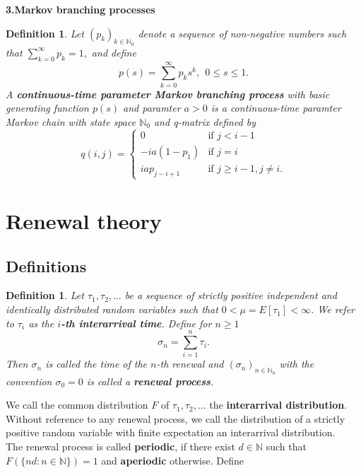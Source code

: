 \documentclass[12pt,a4paper]{scrartcl}
\newtheorem{definition}[theorem]{Definition}
\numberwithin{equation}{section}
\newcommand{\N}{\mathbb{N}} %
\begin{document}
\textbf{3.Markov branching processes}
\begin{definition} \label{defmarkovbranching}
Let $\left(p_k\right)_{k \in \N_0}$ denote a sequence of non-negative numbers such that $\sum_{k=0}^{\infty} p_k = 1,$ and define 
$$ p\left(s\right) = \sum_{k=0}^{\infty} p_k s^k, \ \ 0 \leq s \leq 1 .$$
A \textbf{continuous-time parameter Markov branching process} with basic generating function $p\left(s\right)$ and paramter $a > 0$ is a continuous-time paramter Markov chain with state space $\N_0$ and q-matrix defined by 
$$q\left(i,j\right) = \begin{cases} 0 &\mbox{if } j < i-1 \\-ia\left(1-p_1\right) &\mbox{if } j = i \\iap_{j-i+1} &\mbox{if } j \geq i-1, j \neq i. \end{cases}$$

\end{definition}



\section{Renewal theory}

\subsection{Definitions}
\begin{definition}
Let $ \tau_1, \tau_2, \ldots $ be a sequence of strictly positive independent and identically distributed random variables such that $ 0 < \mu = E\left[\tau_1\right] < \infty $. We refer to $ \tau_i $ as the \textbf{$i$-th interarrival time}. Define for $ n \geq 1 $ 
$$ \sigma_n = \sum_{i=1}^n \tau_i. $$
Then $ \sigma_n $ is called the time of the $n$-th renewal and $\left(\sigma_n\right)_{n \in \N_0} $ with the convention $\sigma_0 = 0$ is called a \textbf{renewal process}.
\end{definition}

We call the common distribution $ F $ of $\tau_1, \tau_2, \ldots $ the \textbf{interarrival distribution}. Without reference to any renewal process, we call the distribution of a strictly positive random variable with finite expectation an interarrival distribution.\\[2ex]

The renewal process is called \textbf{periodic}, if there exist $ d \in \N $ such that $ F\left(\lbrace nd : n \in \N \rbrace \right) = 1 $ and \textbf{aperiodic} otherwise. Define
\end{document}
